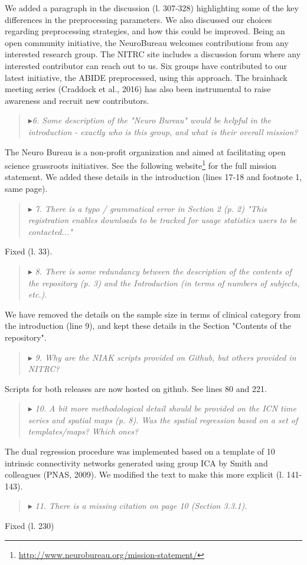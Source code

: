\documentclass[authoryear,3p]{elsarticle}
\begin{document}
We added a paragraph in the discussion (l. 307-328) highlighting some of the key differences in the preprocessing parameters. We also discussed our choices regarding preprocessing strategies, and how this could be improved. Being an open community initiative, the NeuroBureau welcomes contributions from any interested research group. The NITRC site includes a discussion forum where any interested contributor can reach out to us. Six groups have contributed to our latest initiative, the ABIDE preprocessed, using this approach. The brainhack meeting series (Craddock et al., 2016) has also been instrumental to raise awareness and recruit new contributors. 

\begin{quote}
$\blacktriangleright$\emph{6. Some description of the "Neuro Bureau" would be helpful in the introduction - exactly who is this group, and what is their overall mission?
}
\end{quote}

The Neuro Bureau is a non-profit organization and aimed at facilitating open science grassroots initiatives. See the following website\footnote{\url{http://www.neurobureau.org/mission-statement/}} for the full mission statement. We added these details in the introduction (lines 17-18 and footnote 1, same page).  

\begin{quote}
$\blacktriangleright$\emph{ 7. There is a typo / grammatical error in Section 2 (p. 2) "This registration enables downloads to be tracked for usage statistics users to be contacted..."
}
\end{quote}
Fixed (l. 33). 


\begin{quote}
$\blacktriangleright$\emph{ 
8. There is some redundancy between the description of the contents of the repository (p. 3) and the Introduction (in terms of numbers of subjects, etc.).
}
\end{quote}
We have removed the details on the sample size in terms of clinical category from the introduction (line 9), and kept these details in the Section "Contents of the repository". 

\begin{quote}
$\blacktriangleright$\emph{ 
9. Why are the NIAK scripts provided on Github, but others provided in NITRC?}
\end{quote}
Scripts for both releases are now hosted on github. See lines 80 and 221. 

\begin{quote}
$\blacktriangleright$\emph{ 
10. A bit more methodological detail should be provided on the ICN time series and spatial maps (p. 8).  Was the spatial regression based on a set of templates/maps?  Which ones?}
\end{quote}
The dual regression procedure was implemented based on a template of 10 intrinsic connectivity networks generated using group ICA by Smith and colleagues (PNAS, 2009). We modified the text to make this more explicit (l. 141-143). 

\begin{quote}
$\blacktriangleright$\emph{ 
11. There is a missing citation on page 10 (Section 3.3.1).
}
\end{quote}

Fixed (l. 230)
\end{document}
